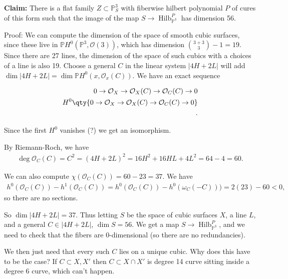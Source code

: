 \textbf{Claim:} There is a flat family \(Z\subset {\mathbb{P}}^3_S\)
with fiberwise hilbert polynomial \(P\) of cures of this form such that
the image of the map \(S \to \operatorname{Hilb}_{{\mathbb{P}}^3}^P\)
has dimension 56.

Proof: We can compute the dimension of the space of smooth cubic
surfaces, since these live in
\({\mathbb{P}}H^0({\mathbb{P}}^3, {\mathcal{O}}(3))\), which has
dimension \({3+3\choose 3} -1 = 19\). Since there are 27 lines, the
dimension of the space of such cubics with a choices of a line is also
19. Choose a general \(C\) in the linear system
\({\left\lvert {4H + 2L} \right\rvert}\) will add
\(\dim {\left\lvert {4H + 2L} \right\rvert} = \dim {\mathbb{P}}H^0(x, {\mathcal{O}}_x(C))\).
We have an exact sequence

\begin{align*} 0 \to {\mathcal{O}}_X \to {\mathcal{O}}_X(C) \to {\mathcal{O}}_C(C) \to 0 \\ H^0\qty{ 0 \to {\mathcal{O}}_X \to {\mathcal{O}}_X(C) \to {\mathcal{O}}_C(C) \to 0 } \\ .\end{align*}

Since the first \(H^0\) vanishes (?) we get an isomorphism.

By Riemann-Roch, we have
\begin{align*}
\deg {\mathcal{O}}_C(C) = C^2 = (4H+2L)^2 = 16H^2 + 16 HL + 4L^2 = 64 - 4 = 60
.\end{align*}

We can also compute \(\chi({\mathcal{O}}_C(C)) = 60 - 23 = 37\). We have
\begin{align*}
h^0({\mathcal{O}}_C(C)) - h^1({\mathcal{O}}_C(C)) =  h^0({\mathcal{O}}_C(C)) - h^0(\omega_C(-C))) = 2(23) - 60 < 0
,\end{align*}
so there are no sections.

So \(\dim {\left\lvert {4H + 2L} \right\rvert} = 37\). Thus letting
\(S\) be the space of cubic surfaces \(X\), a line \(L\), and a general
\(C \in {\left\lvert {4H + 2L} \right\rvert}\), \(\dim S = 56\). We get
a map \(S \to \operatorname{Hilb}_{{\mathbb{P}}^3}^P\), and we need to
check that the fibers are 0-dimensional (so there are no redundancies).

We then just need that every such \(C\) lies on a unique cubic. Why does
this have to be the case? If \(C \subset X, X'\) then
\(C \subset X\cap X'\) is degree 14 curve sitting inside a degree 6
curve, which can't happen.

